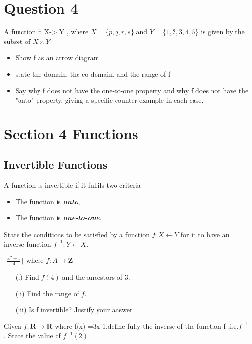 \documentclass[]{report}
\begin{document}
\section*{Question 4}

A function f: X-> Y , where $X = \{p,q,r,s\}$ and $Y =\{1,2,3,4,5\}$
is given by the subset of $X \times Y$


\begin{itemize}
\item Show f as an arrow diagram
\item state the domain, the co-domain, and the range of f
\item Say why f does not have the one-to-one property and why f does 
not have the "onto" property, giving a specific counter example in each case.
\end{itemize}


\section{Section 4 Functions}

\subsection{Invertible Functions}
A function is invertible if it fulfils two criteria
\begin{itemize}
\item The function is \textbf{\textit{onto}},
\item The function is \textbf{\textit{one-to-one}}.
\end{itemize}

State the conditions to be satisfied by a function
$f : X \leftarrow Y$ for it to have an inverse function
$f^{-1} : Y \leftarrow X$.

$\lceil \frac{x^2+1}{4} \rceil$
where $f : A \rightarrow \textbf{Z}$
\begin{itemize}
\item[(i)] Find $f(4)$ and the ancestors of 3.
\item[(ii)] Find the range of $f$.
\item[(iii)] Is f invertible? Justify your answer
\end{itemize}

Given $f : \textbf{R} \rightarrow \textbf{R}$ where f(x) =3x-1,define fully
the inverse of the function f ,i.e.$f^{-1}$. 
State the value of $f^{-1}(2)$
\end{document}
